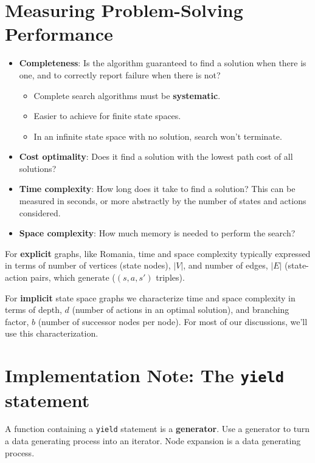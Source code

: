 \documentclass[11pt]{article}
\begin{document}
\section{Measuring Problem-Solving Performance}
\label{sec:orgf3ea960}

\begin{itemize}
\item \textbf{Completeness}: Is the algorithm guaranteed to find a solution when there is one, and to correctly report failure when there is not?

\begin{itemize}
\item Complete search algorithms must be \textbf{systematic}.
\item Easier to achieve for finite state spaces.
\item In an infinite state space with no solution, search won't terminate.
\end{itemize}

\item \textbf{Cost optimality}: Does it find a solution with the lowest path cost of all solutions?
\item \textbf{Time complexity}: How long does it take to find a solution? This can be measured in seconds, or more abstractly by the number of states and actions considered.
\item \textbf{Space complexity}: How much memory is needed to perform the search?
\end{itemize}

For \textbf{explicit} graphs, like Romania, time and space complexity typically expressed in terms of number of vertices (state nodes), \(|V|\), and number of edges, \(|E|\) (state-action pairs, which generate (\((s, a, s')\) triples).

For \textbf{implicit} state space graphs we characterize time and space complexity in terms of depth, \(d\) (number of actions in an optimal solution), and branching factor, \(b\) (number of successor nodes per node).  For most of our discussions, we'll use this characterization.
\section{Implementation Note: The \texttt{yield} statement}
\label{sec:orgbe01eab}

A function containing a \texttt{yield} statement is a \textbf{generator}.  Use a generator to turn a data generating process into an iterator.  Node expansion is a data generating process.
\end{document}
